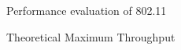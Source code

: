 \begin{section}{Performance evaluation of 802.11}
\begin{subsection}{Theoretical Maximum Throughput}
\begin{figure}[H]
    \end{figure}
  \end{subsection}
\end{section}


